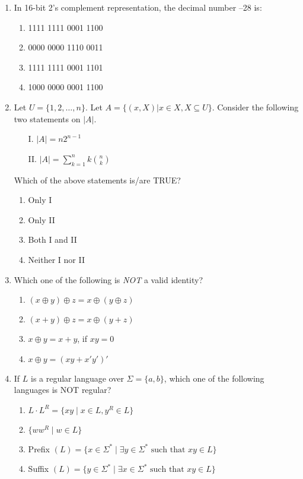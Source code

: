\documentclass[12pt]{article}
\begin{document}
\begin{enumerate}[label=Q.\arabic*]
\item In 16-bit 2's complement representation, the decimal number --28 is:

\begin{multicols}{2}
\begin{enumerate}[label=(\Alph*)]
\item 1111 1111 0001 1100
\item 0000 0000 1110 0011
\item 1111 1111 0001 1101
\item 1000 0000 0001 1100
\end{enumerate}
\end{multicols}

\item Let $U = \{1,2,\ldots,n\}$. Let $A = \{(x, X)|x \in X, X \subseteq U\}$. Consider the following two statements on $|A|$.

\begin{itemize}
\item[I.] $|A| = n2^{n-1}$
\item[II.] $|A| = \sum_{k=1}^{n} k {n \choose k}$
\end{itemize}

Which of the above statements is/are TRUE?

\begin{multicols}{2}
\begin{enumerate}[label=(\Alph*)]
\item Only I
\item Only II
\item Both I and II
\item Neither I nor II
\end{enumerate}
\end{multicols}

\item Which one of the following is \textit{NOT} a valid identity?
\begin{multicols}{2}
\begin{enumerate}[label=(\Alph*)]
\item $(x \oplus y) \oplus z = x \oplus (y \oplus z)$
\item $(x + y) \oplus z = x \oplus (y + z)$
\item $x \oplus y = x + y$, if $xy = 0$
\item $x \oplus y = (xy + x'y')'$
\end{enumerate}
\end{multicols}

\item If $L$ is a regular language over $\Sigma = \{a, b\}$, which one of the following languages is NOT regular?
\begin{enumerate}[label=(\Alph*)]
\item $L \cdot L^R = \{xy \mid x \in L, y^R \in L\}$
\item $\{ww^R \mid w \in L\}$
\item Prefix $(L) = \{x \in \Sigma^* \mid \exists y \in \Sigma^* \text{ such that } xy \in L\}$
\item Suffix $(L) = \{y \in \Sigma^* \mid \exists x \in \Sigma^* \text{ such that } xy \in L\}$
\end{enumerate}


\end{enumerate}
\end{document}
